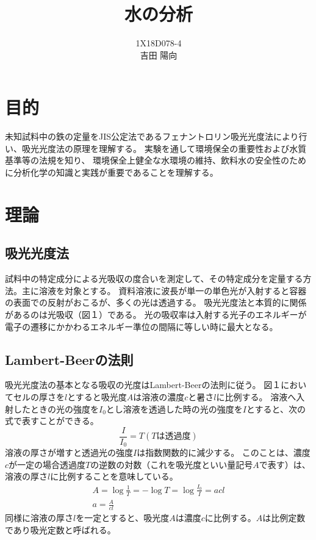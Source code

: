 \documentclass[11pt]{jsarticle}
\begin{document}
\title{水の分析}
\author{1X18D078-4 \\ 吉田 陽向}
\maketitle
\newpage
\section{目的}
未知試料中の鉄の定量をJIS公定法であるフェナントロリン吸光光度法により行い、吸光光度法の原理を理解する。
実験を通して環境保全の重要性および水質基準等の法規を知り、
環境保全上健全な水環境の維持、飲料水の安全性のために分析化学の知識と実践が重要であることを理解する。
\section{理論}
\subsection{吸光光度法}
試料中の特定成分による光吸収の度合いを測定して、その特定成分を定量する方法。主に溶液を対象とする。
資料溶液に波長が単一の単色光が入射すると容器の表面での反射がおこるが、多くの光は透過する。
吸光光度法と本質的に関係があるのは光吸収（図１）である。
光の吸収率は入射する光子のエネルギーが電子の遷移にかかわるエネルギー準位の間隔に等しい時に最大となる。
\subsection{Lambert-Beerの法則}
吸光光度法の基本となる吸収の光度はLambert-Beerの法則に従う。
図１においてセルの厚さを$l$とすると吸光度$A$は溶液の濃度$c$と暑さ$l$に比例する。
溶液へ入射したときの光の強度を$I_0$とし溶液を透過した時の光の強度を$I$とすると、次の式で表すことができる。
\begin{equation}
    \frac{I}{I_0}=T (Tは透過度)
\end{equation}
溶液の厚さが増すと透過光の強度$I$は指数関数的に減少する。
このことは、濃度$c$が一定の場合透過度$T$の逆数の対数（これを吸光度といい量記号$A$で表す）は、溶液の厚さ$l$に比例することを意味している。
\begin{gather}
    A=\log \frac{1}{T}=-\log T=\log \frac{I_0}{I}=acl \\
    a=\frac{A}{cl}
\end{gather}
同様に溶液の厚さ$l$を一定とすると、吸光度$A$は濃度$c$に比例する。$A$は比例定数であり吸光定数と呼ばれる。
\end{document}
